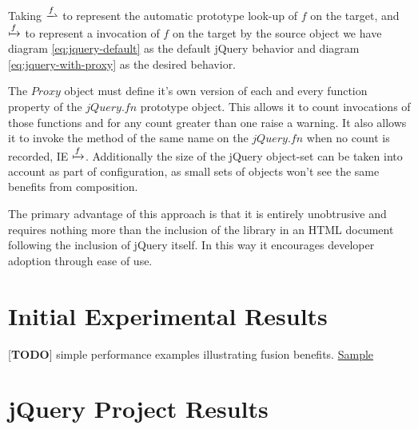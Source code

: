 \documentclass[preprint]{sigplanconf}
\begin{document}
Taking \begin{math}\xrightharpoonup{f}\end{math} to represent the automatic prototype look-up of \begin{math}f\end{math} on the target, and \begin{math}\xmapsto{f}\end{math} to represent a invocation of \begin{math}f\end{math} on the target by the source object we have diagram \ref{eq:jquery-default} as the default jQuery behavior and diagram \ref{eq:jquery-with-proxy} as the desired behavior.

The \begin{math}Proxy\end{math} object must define it's own version of each and every function property of the \begin{math}jQuery.fn\end{math} prototype object. This allows it to count invocations of those functions and for any count greater than one raise a warning. It also allows it to invoke the method of the same name on the \begin{math}jQuery.fn\end{math} when no count is recorded, IE \begin{math}\xmapsto{f}\end{math}. Additionally the size of the jQuery object-set can be taken into account as part of configuration, as small sets of objects won't see the same benefits from composition.

The primary advantage of this approach is that it is entirely unobtrusive and requires nothing more than the inclusion of the library in an HTML document following the inclusion of jQuery itself. In this way it encourages developer adoption through ease of use.

\section{Initial Experimental Results}

[\textbf{TODO}] simple performance examples illustrating fusion benefits. \href{http://jsperf.com/lazy-loop-fusion-vs-traditional-method-chaning/5}{Sample}

\section{jQuery Project Results}
\end{document}
